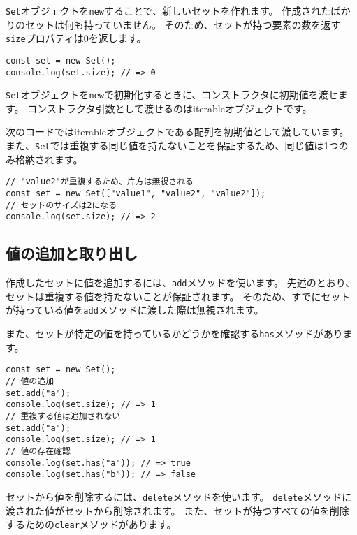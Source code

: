 \texttt{Set}オブジェクトを\texttt{new}することで、新しいセットを作れます。
作成されたばかりのセットは何も持っていません。
そのため、セットが持つ要素の数を返す\texttt{size}プロパティは0を返します。

\begin{lstlisting}
const set = new Set();
console.log(set.size); // => 0
\end{lstlisting}

\texttt{Set}オブジェクトを\texttt{new}で初期化するときに、コンストラクタに初期値を渡せます。
コンストラクタ引数として渡せるのはiterableオブジェクトです。

次のコードではiterableオブジェクトである配列を初期値として渡しています。
また、\texttt{Set}では重複する同じ値を持たないことを保証するため、同じ値は1つのみ格納されます。

\begin{lstlisting}
// "value2"が重複するため、片方は無視される
const set = new Set(["value1", "value2", "value2"]);
// セットのサイズは2になる
console.log(set.size); // => 2
\end{lstlisting}

\hypertarget{set-read-and-write}{%
\subsection{値の追加と取り出し}\label{set-read-and-write}}

作成したセットに値を追加するには、\texttt{add}メソッドを使います。
先述のとおり、セットは重複する値を持たないことが保証されます。
そのため、すでにセットが持っている値を\texttt{add}メソッドに渡した際は無視されます。

また、セットが特定の値を持っているかどうかを確認する\texttt{has}メソッドがあります。

\begin{lstlisting}
const set = new Set();
// 値の追加
set.add("a");
console.log(set.size); // => 1
// 重複する値は追加されない
set.add("a");
console.log(set.size); // => 1
// 値の存在確認
console.log(set.has("a")); // => true
console.log(set.has("b")); // => false
\end{lstlisting}

セットから値を削除するには、\texttt{delete}メソッドを使います。
\texttt{delete}メソッドに渡された値がセットから削除されます。
また、セットが持つすべての値を削除するための\texttt{clear}メソッドがあります。

